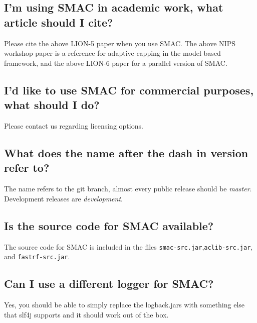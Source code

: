 \documentclass[11pt,letterpaper,oneside]{article}
\begin{document}


\subsection{I'm using SMAC in academic work, what article should I cite?}

Please cite the above LION-5 paper when you use SMAC.
The above NIPS workshop paper is a reference for adaptive capping in the model-based framework, and the above LION-6 paper for a parallel version of SMAC.

\subsection{I'd like to use SMAC for commercial purposes, what should I do?}

Please contact us regarding licensing options.
	
\subsection{What does the name after the dash in version refer to?}

	The name refers to the git branch, almost every public release should be \textit{master}. Development releases are \textit{development}. 

\subsection{Is the source code for SMAC available?}

	The source code for SMAC is included in the files \texttt{smac-src.jar},\texttt{aclib-src.jar}, and \texttt{fastrf-src.jar}.
	
\subsection{Can I use a different logger for SMAC?}

	Yes, you should be able to simply replace the logback.jars with something else that slf4j supports and it should work out of the box. 
\end{document}
